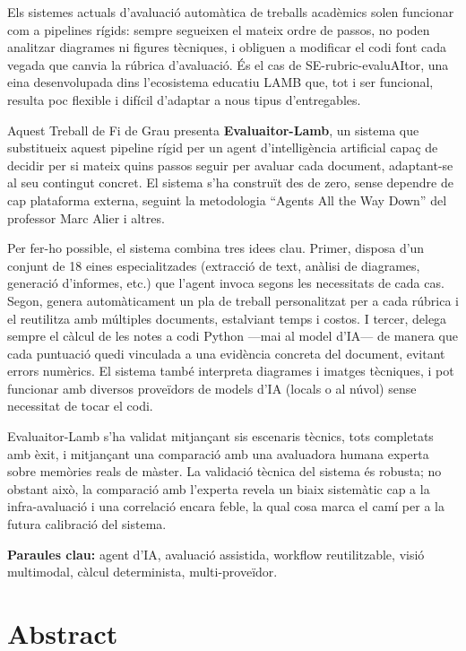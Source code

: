 \documentclass[12pt,a4paper,twoside]{report}
\begin{document}
Els sistemes actuals d'avaluaci\'o autom\`atica de treballs acad\`emics solen funcionar com a pipelines r\'igids: sempre segueixen el mateix ordre de passos, no poden analitzar diagrames ni figures t\`ecniques, i obliguen a modificar el codi font cada vegada que canvia la r\'ubrica d'avaluaci\'o. \'Es el cas de SE-rubric-evaluAItor, una eina desenvolupada dins l'ecosistema educatiu LAMB que, tot i ser funcional, resulta poc flexible i dif\'icil d'adaptar a nous tipus d'entregables.

Aquest Treball de Fi de Grau presenta \textbf{Evaluaitor-Lamb}, un sistema que substitueix aquest pipeline r\'igid per un agent d'intel\textperiodcentered lig\`encia artificial capa\c{c} de decidir per si mateix quins passos seguir per avaluar cada document, adaptant-se al seu contingut concret. El sistema s'ha constru\"it des de zero, sense dependre de cap plataforma externa, seguint la metodologia ``Agents All the Way Down'' \cite{alier2025} del professor Marc Alier i altres.

Per fer-ho possible, el sistema combina tres idees clau. Primer, disposa d'un conjunt de 18 eines especialitzades (extracci\'o de text, an\`alisi de diagrames, generaci\'o d'informes, etc.) que l'agent invoca segons les necessitats de cada cas. Segon, genera autom\`aticament un pla de treball personalitzat per a cada r\'ubrica i el reutilitza amb m\'ultiples documents, estalviant temps i costos. I tercer, delega sempre el c\`alcul de les notes a codi Python ---mai al model d'IA--- de manera que cada puntuaci\'o quedi vinculada a una evid\`encia concreta del document, evitant errors num\`erics. El sistema tamb\'e interpreta diagrames i imatges t\`ecniques, i pot funcionar amb diversos prove\"idors de models d'IA (locals o al n\'uvol) sense necessitat de tocar el codi.

Evaluaitor-Lamb s'ha validat mitjan\c{c}ant sis escenaris t\`ecnics, tots completats amb \`exit, i mitjan\c{c}ant una comparaci\'o amb una avaluadora humana experta sobre mem\`ories reals de m\`aster. La validaci\'o t\`ecnica del sistema \'es robusta; no obstant aix\`o, la comparaci\'o amb l'experta revela un biaix sistem\`atic cap a la infra-avaluaci\'o i una correlaci\'o encara feble, la qual cosa marca el cam\'i per a la futura calibraci\'o del sistema.

\textbf{Paraules clau:} agent d'IA, avaluaci\'o assistida, workflow reutilitzable, visi\'o multimodal, c\`alcul determinista, multi-prove\"idor.


\chapter*{Abstract}
\label{chap:abstract}
\end{document}
